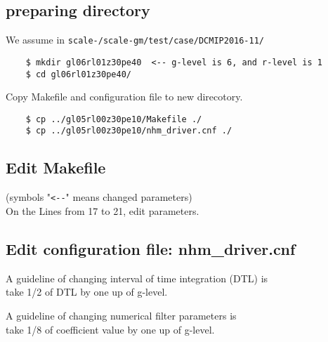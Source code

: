 \subsection{preparing directory}
 We assume in \texttt{scale-{\version}/scale-gm/test/case/DCMIP2016-11/}
 \begin{verbatim}
    $ mkdir gl06rl01z30pe40  <-- g-level is 6, and r-level is 1
    $ cd gl06rl01z30pe40/
 \end{verbatim}

 \noindent Copy Makefile and configuration file to new direcotory.
 \begin{verbatim}
    $ cp ../gl05rl00z30pe10/Makefile ./
    $ cp ../gl05rl00z30pe10/nhm_driver.cnf ./
 \end{verbatim}

\subsection{Edit Makefile}
 (symbols "\verb|<--|" means changed parameters) \\
 On the Lines from 17 to 21, edit parameters.

\subsection{Edit configuration file: nhm\_driver.cnf}
 \noindent A guideline of changing interval of time integration (DTL) is \\
 {\sf take 1/2 of DTL by one up of g-level}.

 \noindent A guideline of changing numerical filter parameters is \\
 {\sf take 1/8 of coefficient value by one up of g-level}. \\

